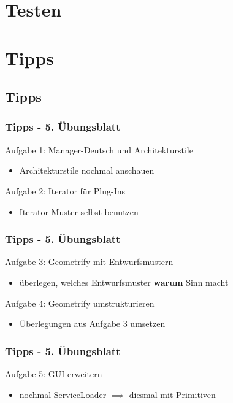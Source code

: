 \documentclass[18pt]{beamer}
\begin{document}
\section{Testen}
	\subsection{}


\section{Tipps}
\subsection{Tipps}
\begin{frame}
\frametitle{Tipps - 5. Übungsblatt}
\begin{exampleblock}{Aufgabe 1: Manager-Deutsch und Architekturstile} 
\begin{itemize}
\item Architekturstile nochmal anschauen
\end{itemize}
\end{exampleblock}
\pause
\begin{exampleblock}{Aufgabe 2: Iterator für Plug-Ins} 
\begin{itemize}
\item Iterator-Muster selbst benutzen
\end{itemize}
\end{exampleblock}
\end{frame}

\begin{frame}
\frametitle{Tipps - 5. Übungsblatt}
\begin{exampleblock}{Aufgabe 3: Geometrify mit Entwurfsmustern}
\begin{itemize}
\item überlegen, welches Entwurfsmuster \textbf{warum} Sinn macht
\end{itemize}
\end{exampleblock}
\pause
\begin{exampleblock}{Aufgabe 4: Geometrify umstrukturieren}
\begin{itemize}
\item Überlegungen aus Aufgabe 3 umsetzen
\end{itemize}
\end{exampleblock}
\end{frame}

\begin{frame}
\frametitle{Tipps - 5. Übungsblatt}
\begin{exampleblock}{Aufgabe 5: GUI erweitern}
\begin{itemize}
\item nochmal ServiceLoader
$\implies$ diesmal mit Primitiven
\end{itemize}
\end{exampleblock}
\end{frame}
\end{document}
